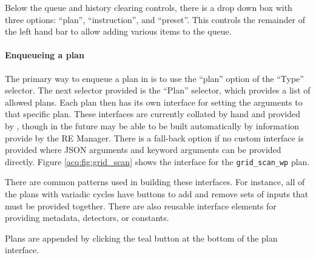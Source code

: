 Below the queue and history clearing controls, there is a drop down box with three options: ``plan'', ``instruction'', and ``preset''.
This controls the remainder of the left hand bar to allow adding various items to the queue.

\paragraph{Enqueueing a plan}

The primary way to enqueue a plan in \blueskycmds is to use the ``plan'' option of the ``Type'' selector.
The next selector provided is the ``Plan'' selector, which provides a list of allowed plans.
Each plan then has its own interface for setting the arguments to that specific plan.
These interfaces are currently collated by hand and provided by \blueskycmds, though in the future may be able to be built automatically by information provide by the RE Manager.
There is a fall-back option if no custom interface is provided where JSON arguments and keyword arguments can be provided directly.
Figure \ref{acq:fig:grid_scan} shows the interface for the \texttt{grid\_scan\_wp} plan.

There are common patterns used in building these interfaces.
For instance, all of the plans with variadic cycles have buttons to add and remove sets of inputs that must be provided together.
There are also reusable interface elements for providing metadata, detectors, or constants.

Plans are appended by clicking the teal button at the bottom of the plan interface.

